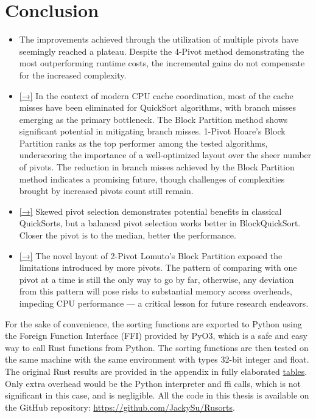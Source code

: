 \documentclass[a4paper,oneside,12pt]{book}
\begin{document}

\section{Conclusion}
\begin{itemize}
\item The improvements achieved through the utilization of multiple pivots have seemingly reached a plateau. Despite the 4-Pivot method demonstrating the most outperforming runtime costs, the incremental gains do not compensate for the increased complexity.
\item \hyperlink{BranchMissMatterMoreThanCache}{[→]} In the context of modern CPU cache coordination, most of the cache misses have been eliminated for QuickSort algorithms, with branch misses emerging as the primary bottleneck. The Block Partition method shows significant potential in mitigating branch misses.
    1-Pivot Hoare's Block Partition ranks as the top performer among the tested algorithms, underscoring the importance of a well-optimized layout over the sheer number of pivots.
    The reduction in branch misses achieved by the Block Partition method indicates a promising future, though challenges of complexities brought by increased pivots count still remain.
\item \hyperlink{UnnecessarySkewed}{[→]} Skewed pivot selection demonstrates potential benefits in classical QuickSorts, but a balanced pivot selection works better in BlockQuickSort. Closer the pivot is to the median, better the performance.
\item \hyperlink{OnlyWayToGo}{[→]} The novel layout of 2-Pivot Lomuto's Block Partition exposed the limitations introduced by more pivots. The pattern of comparing with one pivot at a time is still the only way to go by far,
    otherwise, any deviation from this pattern will pose risks to substantial memory access overheads, impeding CPU performance --- a critical lesson for future research endeavors.
\end{itemize}


For the sake of convenience, the sorting functions are exported to Python using the Foreign Function Interface (FFI) provided by PyO3, which is a safe and easy way to call Rust functions from Python.
The sorting functions are then tested on the same machine with the same environment with types 32-bit integer and float. The original Rust results are provided in the appendix in fully elaborated \hyperlink{FullTables}{tables}.
Only extra overhead would be the Python interpreter and ffi calls, which is not significant in this case, and is negligible. All the code in this thesis is available on the GitHub repository: \url{https://github.com/JackySu/Rusorts}.
\end{document}
